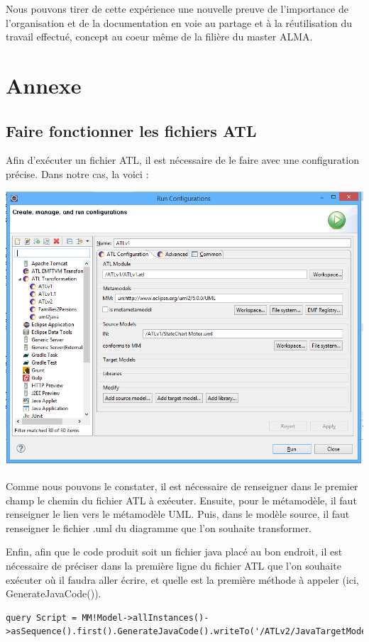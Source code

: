 \documentclass[french, 12pt, a4paper]{article}
\begin{document}
Nous pouvons tirer de cette expérience une nouvelle preuve de l'importance de l'organisation et de la documentation en voie au partage et à la réutilisation du travail effectué, concept au coeur même de la filière du master ALMA.


\newpage
\section{Annexe}
\subsection{Faire fonctionner les fichiers ATL}
Afin d'exécuter un fichier ATL, il est nécessaire de le faire avec une configuration précise. Dans notre cas, la voici : 
	\begin{center}
			\captionsetup{type=figure}
			\includegraphics[scale=0.7]{Images/configurationATL.png}
	\end{center}
	
	Comme nous pouvons le constater, il est nécessaire de renseigner dans le premier champ le chemin du fichier ATL à exécuter. Ensuite, pour le métamodèle, il faut renseigner le lien vers le métamodèle UML. Puis, dans le modèle source, il faut renseigner le fichier .uml du diagramme que l'on souhaite transformer.
	
	Enfin, afin que le code produit soit un fichier java placé au bon endroit, il est nécessaire de préciser dans la première ligne du fichier ATL que l'on souhaite exécuter où il faudra aller écrire, et quelle est la première méthode à appeler (ici, GenerateJavaCode()).
	    \begin{lstlisting}[basicstyle=\small]
query Script = MM!Model->allInstances()->asSequence().first().GenerateJavaCode().writeTo('/ATLv2/JavaTargetModels/main.java');
        \end{lstlisting}
\end{document}

